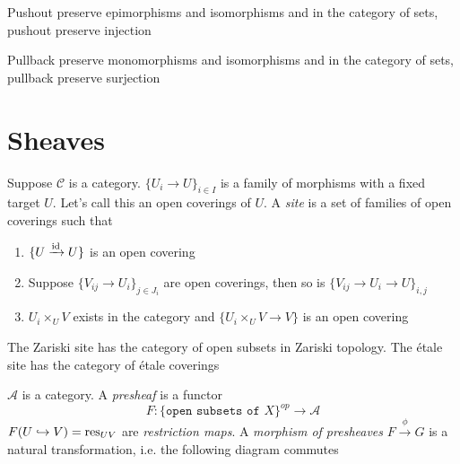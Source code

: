 \documentclass[main]{subfiles}
\begin{document}
\begin{proposition}
Pushout preserve epimorphisms and isomorphisms and in the category of sets, pushout preserve injection \par
Pullback preserve monomorphisms and isomorphisms and in the category of sets, pullback preserve surjection
\end{proposition}

\newpage

\section{Sheaves}

\begin{definition}
Suppose $\mathcal C$ is a category. $\{U_i\to U\}_{i\in I}$ is a family of morphisms with a fixed target $U$. Let's call this an open coverings of $U$. A \textit{site} is a set of families of open coverings such that
\begin{enumerate}
\item $\{U\xrightarrow{\operatorname{id}} U\}$ is an open covering
\item Suppose $\{V_{ij}\to U_i\}_{j\in J_i}$ are open coverings, then so is $\{V_{ij}\to U_i\to U\}_{i,j}$
\item $U_i\times_{U}V$ exists in the category and $\{U_i\times_{U}V\to V\}$ is an open covering
\begin{center}
\end{center}
\end{enumerate}
\end{definition}

\begin{definition}
The Zariski site has the category of open subsets in Zariski topology. The \'etale site has the category of \'etale coverings
\end{definition}

\begin{definition}
$\mathscr A$ is a category. A \textit{presheaf} is a functor
\[F:\{\texttt{open subsets of }X\}^{op}\to\mathscr A\]
$F(U\hookrightarrow V)=\operatorname{res}_{UV}$ are \textit{restriction maps}. A \textit{morphism of presheaves} $F\xrightarrow{\phi} G$ is a natural transformation, i.e. the following diagram commutes
\begin{center}
\end{center}
\end{definition}
\end{document}
